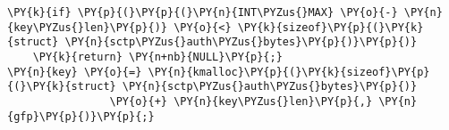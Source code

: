 \begin{Verbatim}[commandchars=\\\{\},codes={\catcode`\$=3\catcode`\^=7\catcode`\_=8}]
\PY{k}{if} \PY{p}{(}\PY{p}{(}\PY{n}{INT\PYZus{}MAX} \PY{o}{-} \PY{n}{key\PYZus{}len}\PY{p}{)} \PY{o}{<} \PY{k}{sizeof}\PY{p}{(}\PY{k}{struct} \PY{n}{sctp\PYZus{}auth\PYZus{}bytes}\PY{p}{)}\PY{p}{)}
    \PY{k}{return} \PY{n+nb}{NULL}\PY{p}{;}
\PY{n}{key} \PY{o}{=} \PY{n}{kmalloc}\PY{p}{(}\PY{k}{sizeof}\PY{p}{(}\PY{k}{struct} \PY{n}{sctp\PYZus{}auth\PYZus{}bytes}\PY{p}{)}
                \PY{o}{+} \PY{n}{key\PYZus{}len}\PY{p}{,} \PY{n}{gfp}\PY{p}{)}\PY{p}{;}
\end{Verbatim}

